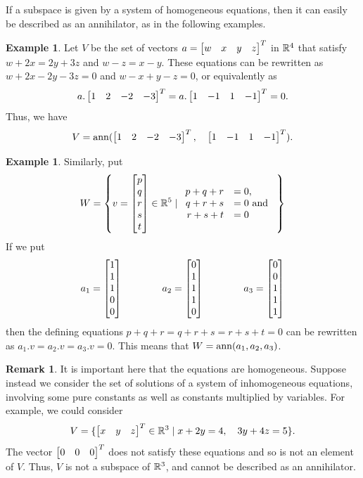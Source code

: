 \documentclass[reqno]{amsart}
\theoremstyle{definition}
\newtheorem{remark}[theorem]{Remark}
\newtheorem{example}[theorem]{Example}
\begin{document}
If a subspace is given by a system of homogeneous equations, then it
can easily be described as an annihilator, as in the following
examples. 
\begin{example}\label{eg-eqs-ann-i}
 Let $V$ be the set of vectors $a=\left[\begin{matrix} w & x & y & z \end{matrix}\right]^T$ in ${\mathbb{R}}^4$
 that satisfy $w+2x=2y+3z$ and $w-z=x-y$.  These equations can be
 rewritten as $w+2x-2y-3z=0$ and $w-x+y-z=0$, or equivalently as 
 \[ a.\left[\begin{matrix} 1 & 2 & -2 & -3 \end{matrix}\right]^T = 
    a.\left[\begin{matrix} 1 & -1 & 1 & -1 \end{matrix}\right]^T = 0.
 \]
 Thus, we have
 \[ V = \operatorname{ann}(\left[\begin{matrix} 1 & 2 & -2 & -3 \end{matrix}\right]^T,\quad
             \left[\begin{matrix} 1 & -1 & 1 & -1 \end{matrix}\right]^T).
 \]
\end{example}
\begin{example}\label{eg-eqs-ann-ii}
 Similarly, put 
 \[ W = \left\{ v=\left[\begin{matrix} p\\q\\r\\s\\t\end{matrix}\right]\in{\mathbb{R}}^5 \;|\;
                   \begin{array}{rl}
                    p+q+r &= 0, \\
                    q+r+s &= 0 \text{ and } \\
                    r+s+t &= 0
                   \end{array}
        \right\}
 \]
 If we put 
 \[ a_1 = \left[\begin{matrix} 1\\1\\1\\0\\0 \end{matrix}\right] \hspace{4em}
    a_2 = \left[\begin{matrix} 0\\1\\1\\1\\0 \end{matrix}\right] \hspace{4em}
    a_3 = \left[\begin{matrix} 0\\0\\1\\1\\1 \end{matrix}\right]
 \]
 then the defining equations $p+q+r=q+r+s=r+s+t=0$ can be rewritten as
 $a_1.v=a_2.v=a_3.v=0$.  This means that $W=\operatorname{ann}(a_1,a_2,a_3)$.
\end{example}
\begin{remark}\label{rem-ann-homog}
 It is important here that the equations are homogeneous.  Suppose
 instead we consider the set of solutions of a system of inhomogeneous
 equations, involving some pure constants as well as constants
 multiplied by variables.  For example, we could consider 
 \[ V = \{\left[\begin{matrix} x & y & z\end{matrix}\right]^T\in{\mathbb{R}}^3 \;|\;
               x+2y = 4,\quad 3y+4z = 5\}.
 \]
 The vector $\left[\begin{matrix} 0 & 0 & 0 \end{matrix}\right]^T$ does not satisfy these equations
 and so is not an element of $V$.  Thus, $V$ is not a subspace of
 ${\mathbb{R}}^3$, and cannot be described as an annihilator.
\end{remark}
\end{document}

